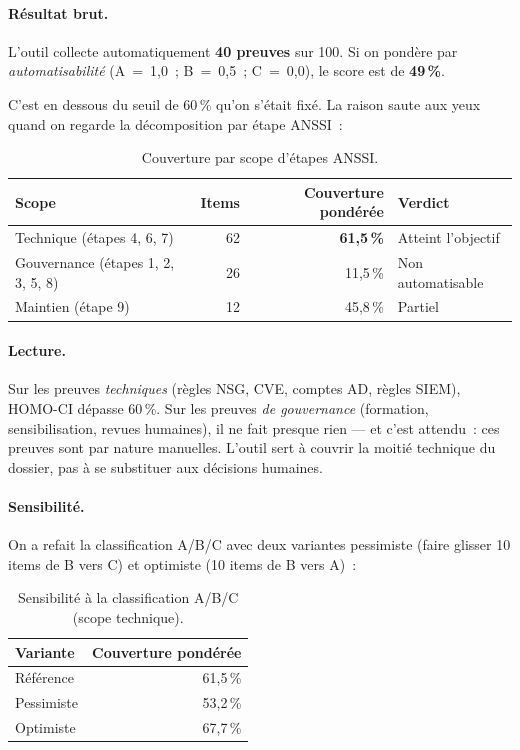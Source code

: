 \paragraph{Résultat brut.} L'outil collecte automatiquement
\textbf{40 preuves} sur 100. Si on pondère par
\emph{automatisabilité} (A~=~1,0~; B~=~0,5~; C~=~0,0), le score
est de \textbf{49\,\%}.

C'est en dessous du seuil de 60\,\% qu'on s'était fixé. La raison
saute aux yeux quand on regarde la décomposition par étape
ANSSI~:

\begin{table}[h]
\centering
\caption{Couverture par scope d'étapes ANSSI.}
\label{tab:couverture}
\small
\begin{tabular}{lrrl}
\toprule
\textbf{Scope} & \textbf{Items} & \textbf{Couverture pondérée} & \textbf{Verdict} \\
\midrule
Technique (étapes 4, 6, 7) & 62 & \textbf{61,5\,\%} & Atteint l'objectif \\
Gouvernance (étapes 1, 2, 3, 5, 8) & 26 & 11,5\,\% & Non automatisable \\
Maintien (étape 9) & 12 & 45,8\,\% & Partiel \\
\bottomrule
\end{tabular}
\end{table}

\paragraph{Lecture.} Sur les preuves \emph{techniques} (règles
NSG, CVE, comptes AD, règles SIEM), HOMO-CI dépasse 60\,\%. Sur
les preuves \emph{de gouvernance} (formation, sensibilisation,
revues humaines), il ne fait presque rien --- et c'est attendu~:
ces preuves sont par nature manuelles. L'outil sert à couvrir
la moitié technique du dossier, pas à se substituer aux
décisions humaines.

\paragraph{Sensibilité.} On a refait la classification A/B/C
avec deux variantes pessimiste (faire glisser 10 items de B vers
C) et optimiste (10 items de B vers A)~:

\begin{table}[h]
\centering
\caption{Sensibilité à la classification A/B/C (scope technique).}
\label{tab:sensibilite-cov}
\small
\begin{tabular}{lr}
\toprule
\textbf{Variante} & \textbf{Couverture pondérée} \\
\midrule
Référence & 61,5\,\% \\
Pessimiste & 53,2\,\% \\
Optimiste & 67,7\,\% \\
\bottomrule
\end{tabular}
\end{table}


